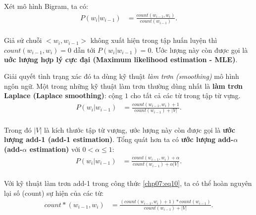 Xét mô hình Bigram, ta có:
\begin{equation}
\begin{split}
P(w_i|w_{i-1})&=\frac{count(w_{i-1},w_i)}{count(w_{i-1})}.\\
\end{split}
\end{equation}

Giả sử chuỗi $<w_i,w_{i-1}>$ không xuất hiện trong tập huấn luyện thì $count(w_{i-1},w_i)=0$ dẫn tới $P(w_i|w_{i-1})=0$. Ước lượng này còn được gọi là \textbf{uớc lượng hợp lý cực đại (Maximum likelihood estimation - MLE)}.

Giải quyết tình trạng xác đó ta dùng kỹ thuật \textit{làm trơn (smoothing)} mô hình ngôn ngữ. Một trong những kỹ thuật làm trơn thường dùng nhất là \textbf{làm trơn Laplace (Laplace smoothing)}: cộng $1$ cho tất cả các từ trong tập từ vựng.
\begin{equation}
\label{chp07:eq10}
\begin{split}
P(w_i|w_{i-1})&=\frac{count(w_{i-1},w_i)+1}{count(w_{i-1})+|V|}.\\
\end{split}
\end{equation}

Trong đó $|V|$ là kích thước tập từ vượng, ước lượng này còn được gọi là \textbf{ước lượng add-1 (add-1 estimation)}. Tổng quát hơn ta có \textbf{ước lượng add-$\alpha$ (add-$\alpha$ estimation)} với $0<\alpha \leq 1$:
\begin{equation}
\label{chp07:eq11}
\begin{split}
P(w_i|w_{i-1})&=\frac{count(w_{i-1},w_i)+\alpha}{count(w_{i-1})+\alpha|V|}.\\
\end{split}
\end{equation}

Với kỹ thuật làm trơn add-1 trong công thức \ref{chp07:eq10}, ta có thể hoàn nguyên lại số (count) sự hiện của các từ:
\begin{equation}
\begin{split}
count*(w_{i-1},w_i)&=\frac{(count(w_{i-1},w_i)+1)*count(w_{i-1})}{count(w_{i-1})+|V|}.\\
\end{split}
\end{equation}

